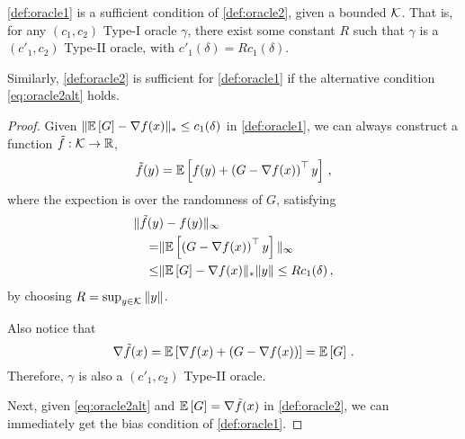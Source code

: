 
\begin{theorem}\label{thm:typered}
\cref{def:oracle1} is a sufficient condition of \cref{def:oracle2}, given a bounded $\mathcal{K}$. That is, for any $(c_1,c_2)$ Type-I oracle $\gamma$, there exist some constant $R$ such that  $\gamma$ is a $(c'_1,c_2)$ Type-II oracle, with $c'_1(\delta)=Rc_1(\delta)$.

Similarly, \cref{def:oracle2} is sufficient for \cref{def:oracle1} if the alternative condition \eqref{eq:oracle2alt} holds.
\end{theorem}
\begin{proof}
Given $\| \mathbb{E}\left[G\right]  - \nabla f(x)  \|_* \le c_1(\delta) $ in \cref{def:oracle1}, we can always construct a function $\tilde{f}:\mathcal{K} \to \mathbb{R}$, 
\[
\tilde{f}(y) =\mathbb{E}\left[ f(y)+ \left( G-\nabla f(x) \right)^\top y\right] \,, 
\]
where the expection is over the randomness of $G$, satisfying
\begin{align*}
\MoveEqLeft
\norm{\tilde{f}(y)-f(y)}_{\infty} \\
= &
 \norm{ \EE{\left( G-\nabla f(x) \right)^\top y}}_{\infty}\\
 \le &\norm{\EE{G}-\nabla f(x)}_* \norm{y}
 \le  Rc_1(\delta)\,,
\end{align*} 
by choosing $R = \sup_{y \in \mathcal{K}}\|y\|$.

Also notice that
\[
 \nabla \tilde{f}(x) = \mathbb{E}\left[\nabla f(x)+ \left( G-\nabla f(x)\right)\right]
 =\mathbb{E}\left[G\right]\,.
\]
Therefore, $\gamma$ is also a $(c'_1,c_2)$ Type-II oracle.

Next, given \eqref{eq:oracle2alt} and $\mathbb{E}\left[G\right]=\nabla \tilde{f}(x)$ in \cref{def:oracle2}, we can immediately get the bias condition of \cref{def:oracle1}. 
\end{proof}

